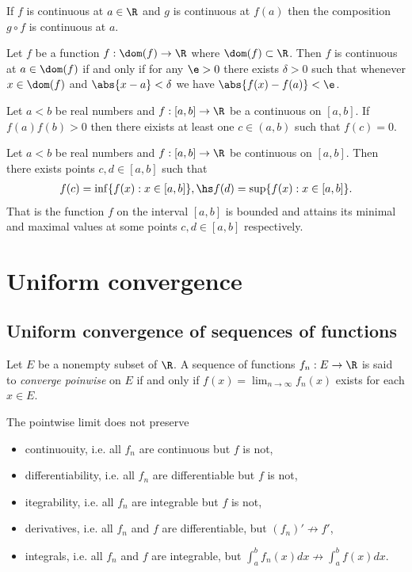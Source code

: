 \documentclass{article}
\begin{document}
\begin{theorem}[Notes 1.11]
	If $f$ is continuous at $a\in\R$ and $g$ is continuous at $f(a)$ then the composition
	$g\circ f$ is continuous at $a$.
\end{theorem}

\begin{theorem}[Notes 1.12]
	Let $f$ be a function $f:\dom(f)\to\R$ where $\dom(f)\subset\R$. Then $f$ is continuous
	at $a\in\dom(f)$ if and only if for any $\e>0$ there exists $\delta>0$ such that
	whenever $x\in\dom(f)$ and $\abs{x-a}<\delta$ we have $\abs{f(x)-f(a)}<\e$.
\end{theorem}

\begin{theorem}
	Let $a<b$ be real numbers and $f:[a,b]\to\R$ be a continuous on $[a,b]$.
	If $f(a)f(b)>0$ then there eixists at least one $c\in(a,b)$ such that $f(c)=0$.
\end{theorem}

\begin{theorem}
	Let $a<b$ be real numbers and $f:[a,b]\to\R$ be continuous on $[a,b]$. Then
	there exists points $c,d\in[a,b]$ such that
	\begin{align*}
		f(c) = \inf\{f(x):x\in[a,b]\},\hs f(d)=\sup\{f(x):x\in[a,b]\}.
	\end{align*}
	That is the function $f$ on the interval $[a,b]$ is bounded and attains its minimal
	and maximal values at some points $c,d\in[a,b]$ respectively.
\end{theorem}

\section{Uniform convergence}

\subsection{Uniform convergence of sequences of functions}

\begin{definition}[Notes 2.1]
	Let $E$ be a nonempty subset of $\R$. A sequence of functions $f_n:E\to\R$ is said to
	\emph{converge poinwise} on $E$ if and only if $f(x)=\lim_{n\to\infty}f_n(x)$ exists
	for each $x\in E$.
\end{definition}

\begin{theorem}
	The pointwise limit does not preserve
	\begin{itemize}
		\item continuouity, i.e. all $f_n$ are continuous but $f$ is not,
		\item differentiability, i.e. all $f_n$ are differentiable but $f$ is not,
		\item itegrability, i.e. all $f_n$ are integrable but $f$ is not,
		\item derivatives, i.e. all $f_n$ and $f$ are differentiable, but $(f_n)'\not\to f'$,
		\item integrals, i.e. all $f_n$ and $f$ are integrable, but $\int_a^b f_n(x)dx\not\to \int_a^b f(x)dx$.
	\end{itemize}
\end{theorem}
\end{document}
